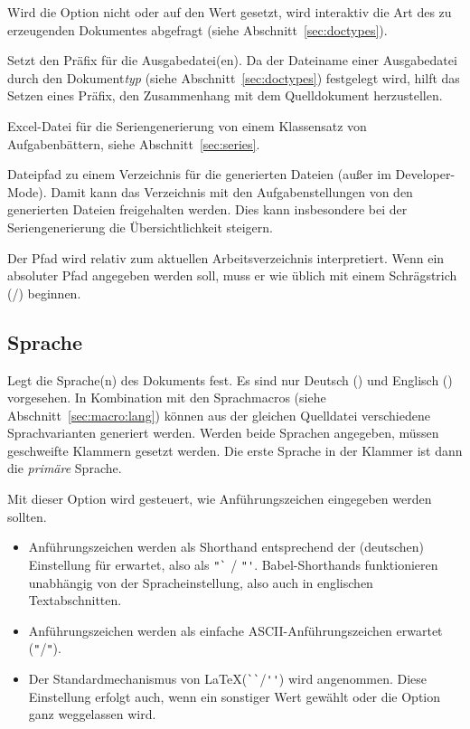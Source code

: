 \documentclass[
load=osgexam,
babel=ngerman
]{skdoc}
\begin{document}
Wird die Option nicht oder auf den Wert  gesetzt, wird interaktiv die Art des zu erzeugenden Dokumentes
abgefragt (siehe Abschnitt~\ref{sec:doctypes}).
\medskip

Setzt den Präfix für die Ausgabedatei(en). Da der Dateiname einer Ausgabedatei durch den Dokument\emph{typ} (siehe Abschnitt~\ref{sec:doctypes}) festgelegt
wird, hilft das Setzen eines Präfix, den Zusammenhang mit dem Quelldokument herzustellen.
\medskip

 Excel-Datei für die Seriengenerierung von einem Klassensatz von
Aufgabenbättern, siehe Abschnitt~\ref{sec:series}.
\medskip

Dateipfad zu einem Verzeichnis für die generierten Dateien (außer im Developer-Mode). Damit kann das Verzeichnis mit den
Aufgabenstellungen von den generierten Dateien freigehalten werden. Dies kann insbesondere bei der Seriengenerierung die
Übersichtlichkeit steigern.

Der Pfad wird relativ zum aktuellen Arbeitsverzeichnis interpretiert. Wenn ein absoluter Pfad angegeben werden soll,
muss er wie üblich mit einem Schrägstrich (/) beginnen.
\medskip

\subsection*{Sprache}
Legt die Sprache(n) des Dokuments fest. Es sind nur Deutsch () und Englisch () vorgesehen. In
Kombination mit den Sprachmacros (siehe Abschnitt~\ref{sec:macro:lang}) können aus der gleichen Quelldatei verschiedene
Sprachvarianten generiert werden. Werden beide Sprachen angegeben, müssen
geschweifte Klammern gesetzt werden. Die erste Sprache in der Klammer ist dann
die \emph{primäre} Sprache.\medskip

Mit dieser Option wird gesteuert, wie Anführungszeichen eingegeben werden sollten.
\begin{itemize}[nosep]
  \item [\opt{babelshorthands}] Anführungszeichen werden als Shorthand entsprechend der (deutschen) Einstellung für
     erwartet, also als \verb!"`! / \verb!"'!. Babel-Shorthands funktionieren unabhängig von der
    Spracheinstellung, also auch in englischen Textabschnitten.
  \item [\opt{ascii}] Anführungszeichen werden als einfache ASCII-Anführungszeichen erwartet (\verb!"!/\verb!"!). 
  \item [\opt{latex}]  Der Standardmechanismus von \LaTeX (\verb!``!/\verb!''!) wird angenommen. Diese Einstellung
    erfolgt auch, wenn ein sonstiger Wert gewählt oder die Option ganz weggelassen wird.
\end{itemize}
\medskip
\end{document}
